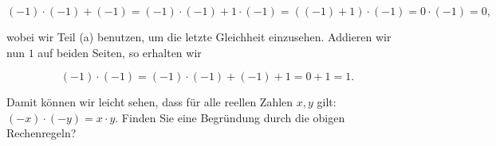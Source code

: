 \documentclass{ximera}
\begin{document}
\[
(-1)\cdot (-1) + (-1) = (-1)\cdot (-1) + 1\cdot (-1) = ((-1)+1) \cdot (-1) = 0\cdot (-1) = 0,
\]

wobei wir Teil (a) benutzen, um die letzte Gleichheit einzusehen.
Addieren wir nun $1$ auf beiden Seiten, so erhalten wir

\[
(-1)\cdot (-1) = (-1)\cdot (-1) + (-1) + 1 = 0+1= 1.
\]

\begin{exercise}
Damit können wir leicht sehen, dass für alle reellen Zahlen $x,y$ gilt: $(-x)\cdot (-y) = x\cdot y$. Finden Sie eine Begründung durch die obigen Rechenregeln?
\begin{solution}
\end{solution}
\end{exercise}
\end{document}

